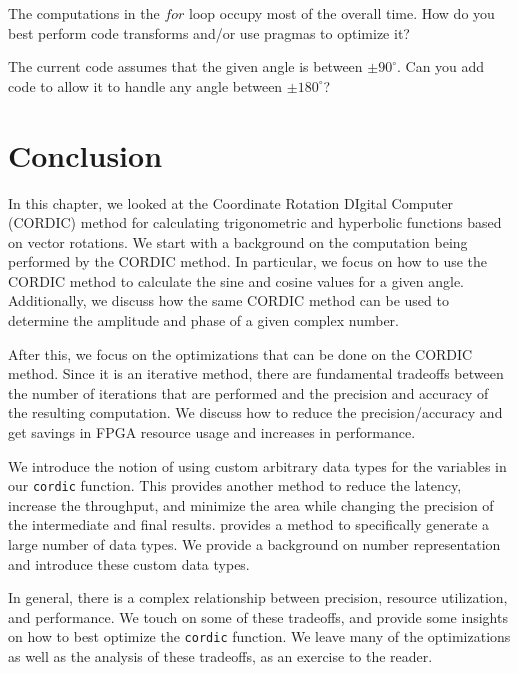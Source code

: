 \begin{exercise}
The computations in the $for$ loop occupy most of the overall time. How do you best perform code transforms and/or use pragmas to optimize it?
\end{exercise}

\begin{exercise}
The current code assumes that the given angle is between $\pm 90^{\circ}$. Can you add code to allow it to handle any angle between $\pm 180^{\circ}$?
\end{exercise}

\section{Conclusion}
In this chapter, we looked at the Coordinate Rotation DIgital Computer (CORDIC) method for calculating trigonometric and hyperbolic functions based on vector rotations. We start with a background on the computation being performed by the CORDIC method. In particular, we focus on how to use the CORDIC method to calculate the sine and cosine values for a given angle. Additionally, we discuss how the same CORDIC method can be used to determine the amplitude and phase of a given complex number.

After this, we focus on the optimizations that can be done on the CORDIC method. Since it is an iterative method, there are fundamental tradeoffs between the number of iterations that are performed and the precision and accuracy of the resulting computation. We discuss how to reduce the precision/accuracy and get savings in FPGA resource usage and increases in performance.

We introduce the notion of using custom arbitrary data types for the variables in our \lstinline{cordic} function. This provides another method to reduce the latency, increase the throughput, and minimize the area while changing the precision of the intermediate and final results. \VHLS provides a method to specifically generate a large number of data types. We provide a background on number representation and introduce these custom data types. 

In general, there is a complex relationship between precision, resource utilization, and performance. We touch on some of these tradeoffs, and provide some insights on how to best optimize the \lstinline{cordic} function. We leave many of the optimizations as well as the analysis of these tradeoffs, as an exercise to the reader. %